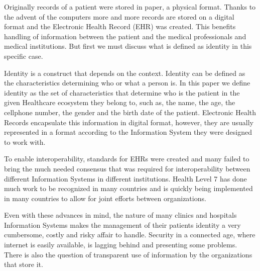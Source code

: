   Originally records of a patient were stored in paper, a physical format.
  Thanks to the advent of the computers more and more records are stored on a
  digital format and the Electronic Health Record (EHR) was created.
  \cite{Marquez2017}  This benefits handling of information between the patient
  and the medical professionals and medical
  institutions.\cite{ONCoordinator2017} But first we must discuss what is
  defined as identity in this specific case.
  
  Identity is a construct that depends on the context.  Identity can be defined
  as the characteristics determining who or what a person is.  In this paper we
  define identity as the set of characteristics that determine who is the
  patient in the given Healthcare ecosystem they belong to, such as, the name,
  the age, the cellphone number, the gender and the birth date of the patient.
  Electronic Health Records encapsulate this information in digital format,
  however, they are usually represented in a format according to the
  Information System they were designed to work with.
  
  To enable interoperability, standards for EHRs were created and many failed
  to bring the much needed consensus that was required for interoperability
  between different Information Systems in different institutions.
  \cite{Eichelberg2006} Health Level 7 has done much work to be recognized in
  many countries and is quickly being implemented in many countries to allow
  for joint efforts between organizations. \cite{HL7Anual2016}
  
  Even with these advances in mind, the nature of many clinics and hospitals
  Information Systems makes the management of their patients identity a very
  cumbersome, costly and risky affair to handle.  Security in a connected age,
  where internet is easily available, is lagging behind and presenting some
  problems.  There is also the question of transparent use of information by
  the organizations that store it.
